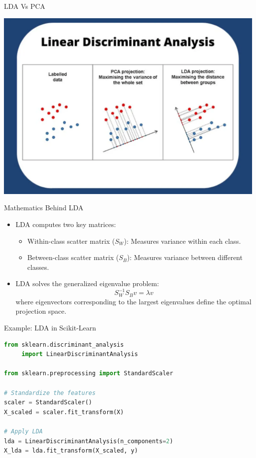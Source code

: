 \documentclass[11pt]{beamer}
\begin{document}
%
%
\begin{frame}{LDA Vs PCA}
	\begin{center}
	\includegraphics[scale=.375]{../05-pictures/lesson-2-2_pic_8.png}
	\end{center}
\end{frame}
%
%
\begin{frame}{Mathematics Behind LDA}
    \begin{itemize}
        \item LDA computes two key matrices:
        \begin{itemize}
            \item Within-class scatter matrix ($S_W$): Measures variance within each class.
            \item Between-class scatter matrix ($S_B$): Measures variance between different classes.
        \end{itemize}
        \item LDA solves the generalized eigenvalue problem:
        \begin{equation}
        S_W^{-1} S_B v = \lambda v
        \end{equation}
        where eigenvectors corresponding to the largest eigenvalues define the optimal projection space.
    \end{itemize}
\end{frame}
%
%
\begin{frame}[fragile]{Example: LDA in Scikit-Learn}
    \begin{lstlisting}[language=Python]
from sklearn.discriminant_analysis 
     import LinearDiscriminantAnalysis
     
from sklearn.preprocessing import StandardScaler

# Standardize the features
scaler = StandardScaler()
X_scaled = scaler.fit_transform(X)

# Apply LDA
lda = LinearDiscriminantAnalysis(n_components=2)
X_lda = lda.fit_transform(X_scaled, y)
    \end{lstlisting}
\end{frame}
\end{document}
